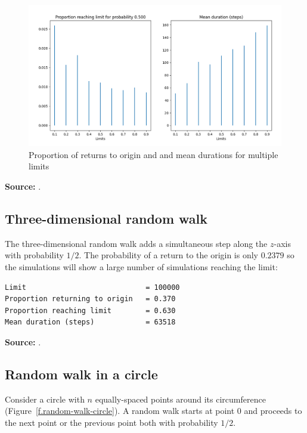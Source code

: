 \documentclass[11pt,a4paper]{article}
\begin{document}
\begin{figure}
\begin{center}
\includegraphics[width=\textwidth]{random-walk-02}
\caption{Proportion of returns to origin and and mean durations for multiple limits}\label{f.random-walk-2D}
\end{center}
\end{figure}

\textbf{Source:} \cite[Problem 51]{mosteller,mos}.

\subsection{Three-dimensional random walk}

The three-dimensional random walk adds a simultaneous step along the $z$-axis with probability $1/2$. The probability of a return to the origin is only $0.2379$ so the simulations will show a large number of simulations reaching the limit:

\begin{verbatim}
Limit                            = 100000
Proportion returning to origin   = 0.370
Proportion reaching limit        = 0.630
Mean duration (steps)            = 63518
\end{verbatim}

\textbf{Source:} \cite[Problem 52]{mosteller,mos}.

\subsection{Random walk in a circle}

Consider a circle with $n$ equally-spaced points around its circumference (Figure~\ref{f.random-walk-circle}). A random walk starts at point $0$ and proceeds to the next point or the previous point both with probability $1/2$.
\end{document}
